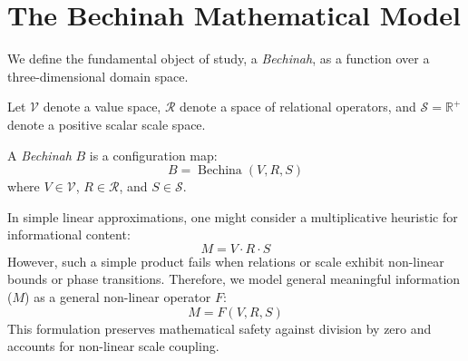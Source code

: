 \section{The Bechinah Mathematical Model}
\label{sec:bechina_model}

We define the fundamental object of study, a \emph{Bechinah}, as a function over a three-dimensional domain space.

\begin{definition}
Let $\mathcal{V}$ denote a value space, $\mathcal{R}$ denote a space of relational operators, and $\mathcal{S} = \mathbb{R}^+$ denote a positive scalar scale space.
\end{definition}

\begin{definition}
A \emph{Bechinah} $B$ is a configuration map:
\begin{equation}
\boxed{B = \operatorname{Bechina}(V, R, S)}
\end{equation}
where $V \in \mathcal{V}$, $R \in \mathcal{R}$, and $S \in \mathcal{S}$.
\end{definition}

In simple linear approximations, one might consider a multiplicative heuristic for informational content:
\begin{equation}
M = V \cdot R \cdot S
\end{equation}
However, such a simple product fails when relations or scale exhibit non-linear bounds or phase transitions. Therefore, we model general meaningful information ($M$) as a general non-linear operator $F$:
\begin{equation}
M = F(V, R, S)
\end{equation}
This formulation preserves mathematical safety against division by zero and accounts for non-linear scale coupling.
